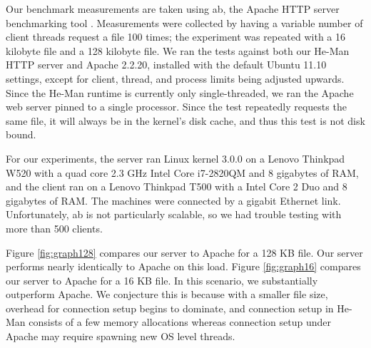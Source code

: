 \documentclass[preprint,10pt]{sigplanconf}
\begin{document}
Our benchmark measurements are taken using ab, the Apache HTTP server
benchmarking tool \cite{ApacheAB}. Measurements were collected by
having a variable number of client threads request a file 100 times;
the experiment was repeated with a 16 kilobyte file and a 128 kilobyte
file. We ran the tests against both our He-Man HTTP server and Apache
2.2.20, installed with the default Ubuntu 11.10 settings, except for
client, thread, and process limits being adjusted upwards. Since the
He-Man runtime is currently only single-threaded, we ran the Apache
web server pinned to a single processor. Since the test repeatedly
requests the same file, it will always be in the kernel's disk cache,
and thus this test is not disk bound.

For our experiments, the server ran Linux kernel 3.0.0 on a Lenovo
Thinkpad W520 with a quad core 2.3 GHz Intel Core i7-2820QM and 8
gigabytes of RAM, and the client ran on a Lenovo Thinkpad T500 with a
Intel Core 2 Duo and 8 gigabytes of RAM.  %
The machines were connected by a gigabit Ethernet link.
Unfortunately, ab is not particularly scalable, so we had trouble
testing with more than 500 clients.

Figure \ref{fig:graph128} compares our server to Apache for a 128 KB
file. Our server performs nearly identically to Apache on this load.
Figure \ref{fig:graph16} compares our server to Apache for a 16 KB
file. In this scenario, we substantially outperform Apache. We
conjecture this is because with a smaller file size, overhead for
connection setup begins to dominate, and connection setup in He-Man
consists of a few memory allocations whereas connection setup under
Apache may require spawning new OS level threads.
\end{document}
